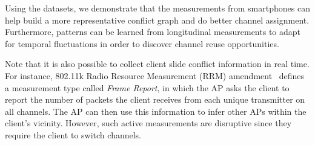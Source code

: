 Using the datasets, we demonstrate that the measurements from smartphones can
help build a more representative conflict graph and do better channel
assignment. Furthermore, patterns can be learned from longitudinal
measurements to adapt for temporal fluctuations in order to discover channel
reuse opportunities.

Note that it is also possible to collect client slide conflict information in
real time. For instance, 802.11k Radio Resource Measurement (RRM)
amendment~\cite{80211k} defines a measurement type called \textit{Frame
Report}, in which the AP asks the client to report the number of packets the
client receives from each unique transmitter on all channels. The AP can then
use this information to infer other APs within the client's vicinity.
However, such active measurements are disruptive since they require the
client to switch channels.

